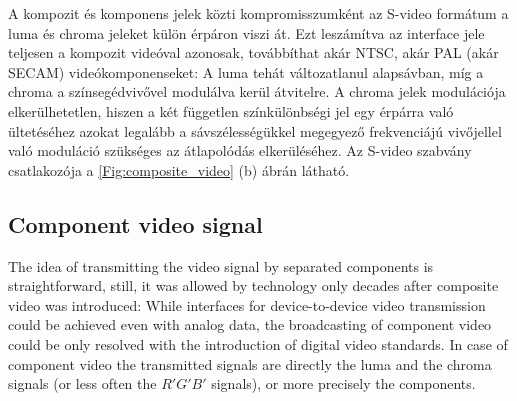 A kompozit és komponens jelek közti kompromisszumként az S-video formátum a luma és chroma jeleket külön érpáron viszi át.
Ezt leszámítva az interface jele teljesen a kompozit videóval azonosak, továbbíthat akár NTSC, akár PAL (akár SECAM) videókomponenseket:
A luma tehát változatlanul alapsávban, míg a chroma a színsegédvivővel modulálva kerül átvitelre.
A chroma jelek modulációja elkerülhetetlen, hiszen a két független színkülönbségi jel egy érpárra való ültetéséhez azokat legalább a sávszélességükkel megegyező frekvenciájú vivőjellel való moduláció szükséges az átlapolódás elkerüléséhez.
Az S-video szabvány csatlakozója a \ref{Fig:composite_video} (b) ábrán látható.


\subsection{Component video signal}

The idea of transmitting the video signal by separated components is straightforward, still, it was allowed by technology only decades after composite video was introduced:
While interfaces for device-to-device video transmission could be achieved even with analog data, the broadcasting of component video could be only resolved with the introduction of digital video standards.
In case of component video the transmitted signals are directly the luma and the chroma signals (or less often the $R'G'B'$ signals), or more precisely the \ypbpr components.

